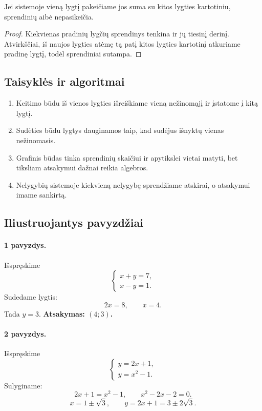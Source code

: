 \begin{teorema}
Jei sistemoje vieną lygtį pakeičiame jos suma su kitos lygties kartotiniu, sprendinių aibė nepasikeičia.
\end{teorema}
\begin{proof}
Kiekvienas pradinių lygčių sprendinys tenkina ir jų tiesinį derinį. Atvirkščiai, iš naujos lygties atėmę tą patį kitos lygties kartotinį atkuriame pradinę lygtį, todėl sprendiniai sutampa.
\end{proof}

\subsection{Taisyklės ir algoritmai}

\begin{enumerate}
\item Keitimo būdu iš vienos lygties išreiškiame vieną nežinomąjį ir įstatome į kitą lygtį.
\item Sudėties būdu lygtys dauginamos taip, kad sudėjus išnyktų vienas nežinomasis.
\item Grafinis būdas tinka sprendinių skaičiui ir apytikslei vietai matyti, bet tiksliam atsakymui dažnai reikia algebros.
\item Nelygybių sistemoje kiekvieną nelygybę sprendžiame atskirai, o atsakymui imame sankirtą.
\end{enumerate}

\subsection{Iliustruojantys pavyzdžiai}

\paragraph{1 pavyzdys.}
Išspręskime
\[
\begin{cases}
x+y=7,\\
x-y=1.
\end{cases}
\]
Sudedame lygtis:
\[
2x=8,\qquad x=4.
\]
Tada $y=3$. \textbf{Atsakymas: $(4;3)$.}

\paragraph{2 pavyzdys.}
Išspręskime
\[
\begin{cases}
y=2x+1,\\
y=x^2-1.
\end{cases}
\]
Sulyginame:
\[
2x+1=x^2-1,\qquad x^2-2x-2=0.
\]
\[
x=1\pm\sqrt3,\qquad y=2x+1=3\pm2\sqrt3.
\]

